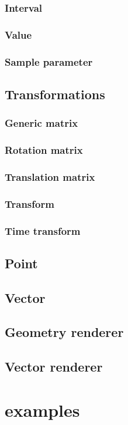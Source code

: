 \documentclass{article}
\begin{document}
\subsubsection{Interval}\label{sss:interval}
\subsubsection{Value}\label{sss:value}
\subsubsection{Sample parameter}\label{sss:samp_par}
\subsection{Transformations}\label{ss:transformations}
\subsubsection{Generic matrix}\label{sss:gen_mat}
\subsubsection{Rotation matrix}\label{sss:rot_mat}
\subsubsection{Translation matrix}\label{sss:transl_mat}
\subsubsection{Transform}\label{sss:trans}
\subsubsection{Time transform}\label{sss:time_trans}
\subsection{Point}\label{ss:point}
\subsection{Vector}\label{ss:vector}
\subsection{Geometry renderer}\label{ss:geo_rend}
\subsection{Vector renderer}\label{ss:vec_rend}
\section{examples}\label{s:examples}
\end{document}
